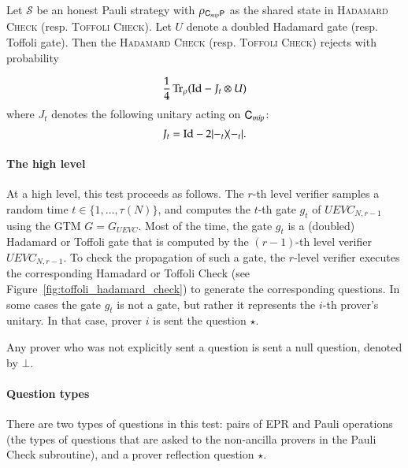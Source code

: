 \begin{lemma}
\label{lem:ver_gate_check}
	Let $\mathcal{S}$ be an honest Pauli strategy with $\rho_{{\mathsf{C}}_{mip} {\mathsf{P}}}$ as the shared state in \textsc{Hadamard Check} (resp. \textsc{Toffoli Check}). Let $U$ denote a doubled Hadamard gate (resp. Toffoli gate). Then the \textsc{Hadamard Check} (resp. \textsc{Toffoli Check}) rejects with probability 
	
	\[
		\frac{1}{4} \operatorname{Tr}_{\rho} ( \mathop{\mathrm{Id}}\!\mathinner{} - J_t \otimes U )
	\]
	where $J_t$ denotes the following unitary acting on ${\mathsf{C}}_{mip}$:
	\[
		J_t = \mathop{\mathrm{Id}}\!\mathinner{} - 2|-_t\rangle\! \langle -_t|.
	\]
\end{lemma}

\paragraph{The high level}  At a high level, this test  proceeds as follows. The $r$-th level verifier samples a random time $t \in \{1,\ldots,\tau(N)\}$, and computes the $t$-th gate $g_t$ of $UEVC_{N,r-1}$ using the GTM $G = G_{UEVC}$. Most of the time, the gate $g_t$ is a (doubled) Hadamard or Toffoli gate that is computed by the $(r-1)$-th level verifier $UEVC_{N,r-1}$. To check the propagation of such a gate, the $r$-level verifier executes the corresponding Hamadard or Toffoli Check (see Figure~\ref{fig:toffoli_hadamard_check}) to generate the corresponding questions. %
In some cases the gate $g_t$ is not a gate, but rather it represents the $i$-th prover's unitary. In that case, prover $i$ is sent the question $\star$.  

Any prover who was not explicitly sent a question is sent a null question, denoted by $\bot$.

\paragraph{Question types} There are two types of questions in this test: pairs of EPR and Pauli operations (the types of questions that are asked to the non-ancilla provers in the Pauli Check subroutine), and a prover reflection question $\star$.


